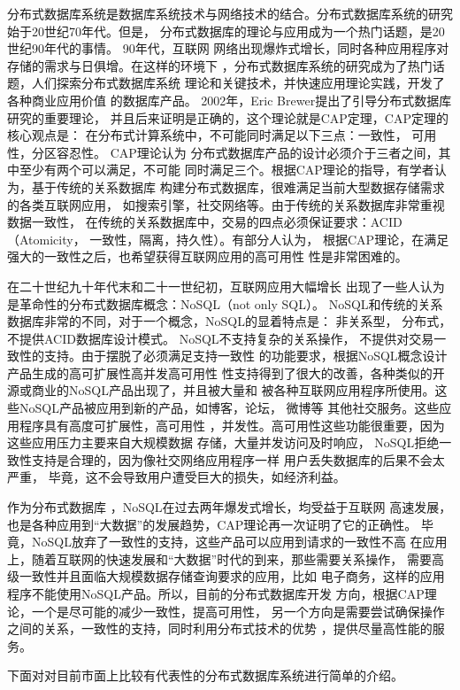 分布式数据库系统是数据库系统技术与网络技术的结合。分布式数据库系统的研究始于20世纪70年代。但是，
分布式数据库的理论与应用成为一个热门话题，是20世纪90年代的事情。
 90年代，互联网
网络出现爆炸式增长，同时各种应用程序对存储的需求与日俱增。在这样的环境下
，分布式数据库系统的研究成为了热门话题，人们探索分布式数据库系统
理论和关键技术，并快速应用理论实践，开发了各种商业应用价值
的数据库产品。 2002年，Eric Brewer提出了引导分布式数据库研究的重要理论，
并且后来证明是正确的，这个理论就是CAP定理，CAP定理的核心观点是：
在分布式计算系统中，不可能同时满足以下三点：一致性，
可用性，分区容忍性。 CAP理论认为
分布式数据库产品的设计必须介于三者之间，其中至少有两个可以满足，不可能
同时满足三个。根据CAP理论的指导，有学者认为，基于传统的关系数据库
构建分布式数据库，很难满足当前大型数据存储需求的各类互联网应用，
如搜索引擎，社交网络等。由于传统的关系数据库非常重视数据一致性，
在传统的关系数据库中，交易的四点必须保证要求：ACID（Atomicity，
一致性，隔离，持久性）。有部分人认为，
根据CAP理论，在满足强大的一致性之后，也希望获得互联网应用的高可用性
性是非常困难的。

在二十世纪九十年代末和二十一世纪初，互联网应用大幅增长
出现了一些人认为是革命性的分布式数据库概念：NoSQL（not only SQL）。
NoSQL和传统的关系数据库非常的不同，对于一个概念，NoSQL的显着特点是：
非关系型，
分布式，不提供ACID数据库设计模式。 NoSQL不支持复杂的关系操作，
不提供对交易一致性的支持。由于摆脱了必须满足支持一致性
的功能要求，根据NoSQL概念设计产品生成的高可扩展性高并发高可用性
性支持得到了很大的改善，各种类似的开源或商业的NoSQL产品出现了，并且被大量和
被各种互联网应用程序所使用。这些NoSQL产品被应用到新的产品，如博客，论坛，
微博等
其他社交服务。这些应用程序具有高度可扩展性，高可用性
，并发性。高可用性这些功能很重要，因为这些应用压力主要来自大规模数据
存储，大量并发访问及时响应，
NoSQL拒绝一致性支持是合理的，因为像社交网络应用程序一样
用户丢失数据库的后果不会太严重，
毕竟，这不会导致用户遭受巨大的损失，如经济利益。


作为分布式数据库
，NoSQL在过去两年爆发式增长，均受益于互联网
高速发展，也是各种应用到“大数据”的发展趋势，CAP理论再一次证明了它的正确性。
毕竟，NoSQL放弃了一致性的支持，这些产品可以应用到请求的一致性不高
在应用上，随着互联网的快速发展和“大数据”时代的到来，那些需要关系操作，
需要高级一致性并且面临大规模数据存储查询要求的应用，比如
电子商务，这样的应用程序不能使用NoSQL产品。所以，目前的分布式数据库开发
方向，根据CAP理论，一个是尽可能的减少一致性，提高可用性，
另一个方向是需要尝试确保操作之间的关系，一致性的支持，同时利用分布式技术的优势
，提供尽量高性能的服务。

下面对对目前市面上比较有代表性的分布式数据库系统进行简单的介绍。

